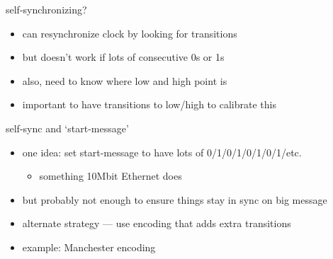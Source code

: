 

\begin{frame}{self-synchronizing?}
    \begin{itemize}
    \item can resynchronize clock by looking for transitions
    \item but doesn't work if lots of consecutive 0s or 1s
    \vspace{.5cm}
    \item also, need to know where low and high point is
    \item important to have transitions to low/high to calibrate this
    \end{itemize}
\end{frame}

\begin{frame}{self-sync and `start-message'}
    \begin{itemize}
    \item one idea: set start-message to have lots of 0/1/0/1/0/1/0/1/etc.
        \begin{itemize}
        \item something 10Mbit Ethernet does
        \end{itemize}
    \item but probably not enough to ensure things stay in sync on big message
    \vspace{.5cm}
    \item alternate strategy --- use encoding that adds extra transitions
    \item example: Manchester encoding
    \end{itemize}
\end{frame}

